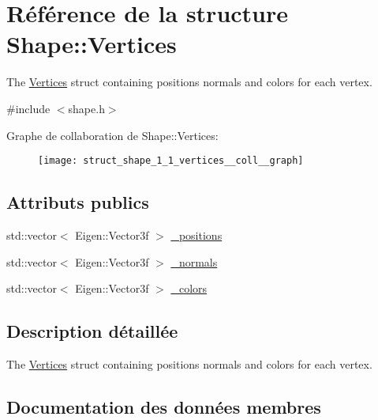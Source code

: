 \hypertarget{struct_shape_1_1_vertices}{}\section{Référence de la structure Shape\+:\+:Vertices}
\label{struct_shape_1_1_vertices}


The \hyperlink{struct_shape_1_1_vertices}{Vertices} struct containing positions normals and colors for each vertex.  




{\ttfamily \#include $<$shape.\+h$>$}



Graphe de collaboration de Shape\+:\+:Vertices\+:\nopagebreak
\begin{figure}[H]
\begin{center}
\leavevmode
\texttt{[image: struct\_shape\_1\_1\_vertices\_\_coll\_\_graph]}
\end{center}
\end{figure}
\subsection*{Attributs publics}
\begin{DoxyCompactItemize}
\item 
std\+::vector$<$ Eigen\+::\+Vector3f $>$ \hyperlink{struct_shape_1_1_vertices_aef6a4c183b595cffa5e890e3ba06c64d}{\+\_\+positions}
\item 
std\+::vector$<$ Eigen\+::\+Vector3f $>$ \hyperlink{struct_shape_1_1_vertices_aa258b760267bf6e5b316ac6ec11a2ea3}{\+\_\+normals}
\item 
std\+::vector$<$ Eigen\+::\+Vector3f $>$ \hyperlink{struct_shape_1_1_vertices_a4f3730170f6a9b58be002ea913926e4a}{\+\_\+colors}
\end{DoxyCompactItemize}


\subsection{Description détaillée}
The \hyperlink{struct_shape_1_1_vertices}{Vertices} struct containing positions normals and colors for each vertex. 

\subsection{Documentation des données membres}
\mbox{\label{struct_shape_1_1_vertices_a4f3730170f6a9b58be002ea913926e4a}} 
